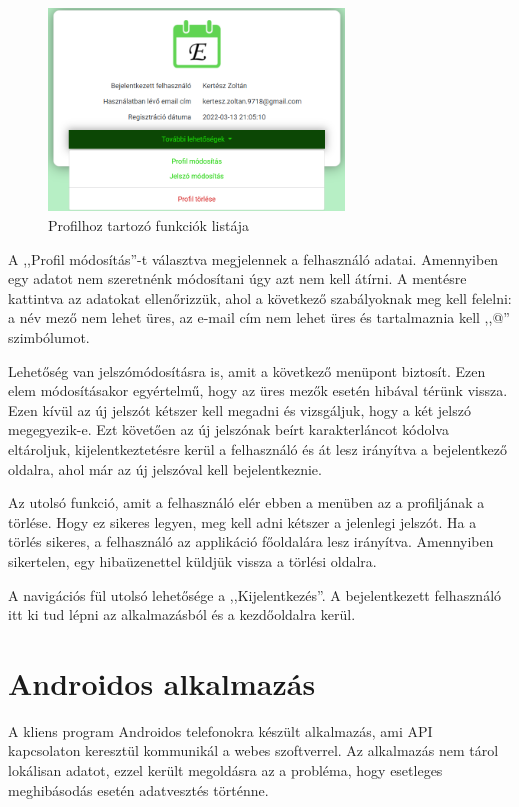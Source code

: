 \documentclass[
]{thesis-ekf}
\theoremstyle{definition}
\theoremstyle{remark}
\begin{document}
	\begin{figure}[ht!]
		\centering
		\includegraphics[width=0.7\textwidth]{web_app/web_profile_functions}
		\caption{Profilhoz tartozó funkciók listája}
		\label{figure:webapp_profile_functions}
	\end{figure}
	
	A ,,Profil módosítás''-t választva megjelennek a felhasználó adatai. Amennyiben egy adatot nem szeretnénk módosítani úgy azt nem kell átírni. A mentésre kattintva az adatokat ellenőrizzük,  ahol a következő szabályoknak meg kell felelni: a név mező nem lehet üres, az e-mail cím nem lehet üres és tartalmaznia kell ,,@'' szimbólumot.
	
	Lehetőség van jelszómódosításra is, amit a következő menüpont biztosít. Ezen elem módosításakor egyértelmű, hogy az üres mezők esetén hibával térünk vissza. Ezen kívül
	az új jelszót kétszer kell megadni és vizsgáljuk, hogy a két jelszó megegyezik-e. Ezt követően az új jelszónak beírt karakterláncot kódolva eltároljuk, kijelentkeztetésre kerül a felhasználó és át lesz irányítva a bejelentkező oldalra, ahol már az új jelszóval kell bejelentkeznie.
	
	Az utolsó funkció, amit a felhasználó elér ebben a menüben az a profiljának a törlése. Hogy ez sikeres legyen, meg kell adni kétszer a jelenlegi jelszót. Ha a törlés sikeres, a felhasználó az applikáció főoldalára lesz irányítva. Amennyiben sikertelen, egy hibaüzenettel küldjük vissza a törlési oldalra.
	
	A navigációs fül utolsó lehetősége a ,,Kijelentkezés''. A bejelentkezett felhasználó itt ki tud lépni az alkalmazásból és a kezdőoldalra kerül. 
	
	\section{Androidos alkalmazás}
	A kliens program Androidos telefonokra készült alkalmazás, ami API~\cite{api_basic} kapcsolaton keresztül kommunikál a webes szoftverrel. Az alkalmazás nem tárol lokálisan adatot, ezzel került megoldásra az a probléma, hogy esetleges meghibásodás esetén adatvesztés történne. 
	
\end{document}
